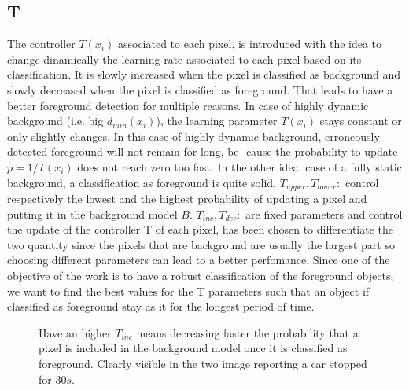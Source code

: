 \subsection*{T}
The controller $T(x_i)$ associated to each pixel, is introduced with the idea to change dinamically the learning rate associated to each pixel based on its classification. It is slowly increased when the pixel is classified as background and slowly decreased when the pixel is classified as foreground. That leads to have a better foreground detection for multiple reasons. \newline
In case of highly dynamic background (i.e. big $\overline{d}_{min}(x_i)$), the learning parameter $T(x_i)$ stays constant or only slightly changes. In this case of highly dynamic background, erroneously detected foreground will not remain for long, be-
cause the probability to update $p = 1/T(x_i)$ does not reach
zero too fast. \newline
In the other ideal case of a fully static background, a classification as foreground is quite solid. \newline
$T_{upper}, T_{lower}:$ control respectively the lowest and the highest probability of updating a pixel and putting it in the
background model $B$. \newline
$T_{inc}, T_{dec}:$ are fixed parameters and control the update of the controller T of each pixel, has been chosen to differentiate the two quantity since the pixels that are background are usually the largest part so choosing different parameters can lead to a better perfomance.\newline
Since one of the objective of the work is to have a robust classification of the foreground objects, we want to find the best values for the T parameters such that an object if classified as foreground stay as it for the longest period of time. 
\begin{figure}[!t]
    \centering
    \newline
    \caption{Have an higher $T_{inc}$ means decreasing faster the probability that a pixel is included in the background model once it is classified as foreground. Clearly visible in the two image reporting a car stopped for $30s$.}
\end{figure}


